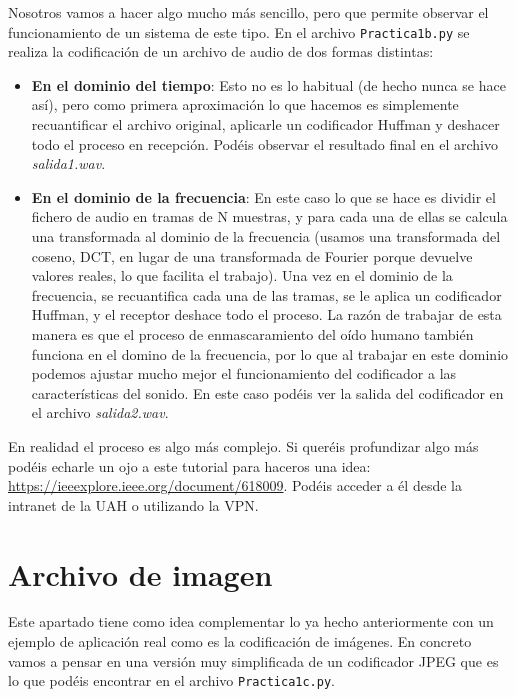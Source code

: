 \documentclass[es,practica]{uah}
\begin{document}
Nosotros vamos a hacer algo mucho más sencillo, pero que permite observar el funcionamiento de un sistema de este tipo. En el archivo \texttt{Practica1b.py} se realiza la codificación de un archivo de audio de dos formas distintas:

\begin{itemize}
	\item {\bf En el dominio del tiempo}: Esto no es lo habitual (de hecho nunca se hace así), pero como primera aproximación lo que hacemos es simplemente recuantificar el archivo original, aplicarle un codificador Huffman y deshacer todo el proceso en recepción. Podéis observar el resultado final en el archivo \emph{salida1.wav}.
	\item {\bf En el dominio de la frecuencia}: En este caso lo que se hace es dividir el fichero de audio en tramas de N muestras, y para cada una de ellas se calcula una transformada al dominio de la frecuencia (usamos una transformada del coseno, DCT, en lugar de una transformada de Fourier porque devuelve valores reales, lo que facilita el trabajo). Una vez en el dominio de la frecuencia, se recuantifica cada una de las tramas, se le aplica un codificador Huffman, y el receptor deshace todo el proceso. La razón de trabajar de esta manera es que el proceso de enmascaramiento del oído humano también funciona en el domino de la frecuencia, por lo que al trabajar en este dominio podemos ajustar mucho mejor el funcionamiento del codificador a las características del sonido. En este caso podéis ver la salida del codificador en el archivo \emph{salida2.wav}.
\end{itemize}


En realidad el proceso es algo más complejo. Si queréis profundizar algo más podéis echarle un ojo a este tutorial para haceros una idea: \url{https://ieeexplore.ieee.org/document/618009}. Podéis acceder a él desde la intranet de la UAH o utilizando la VPN. 




\section{Archivo de imagen}

Este apartado tiene como idea complementar lo ya hecho anteriormente con un ejemplo de aplicación real como es la codificación de imágenes. En concreto vamos a pensar en una versión muy simplificada de un codificador JPEG que es lo que podéis encontrar en el archivo \texttt{Practica1c.py}.
\end{document}
